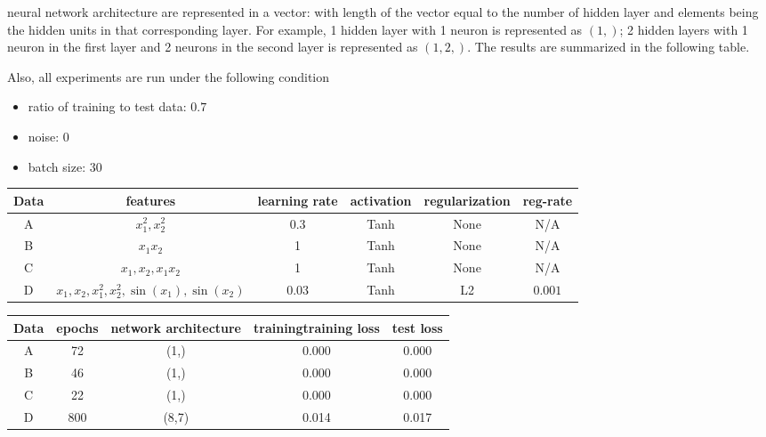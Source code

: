 \documentclass{article}
\begin{document}
neural network architecture are represented in a vector: with length of the vector equal to the number of hidden layer and elements being the hidden units in that corresponding layer. For example, 1 hidden layer with 1 neuron is represented as \((1,)\); 2 hidden layers with 1 neuron in the first layer and 2 neurons in the second layer is represented as \((1,2,)\). The results are summarized in the following table.

Also, all experiments are run under the following condition
\begin{itemize}
    \item ratio of training to test data: \(0.7\)
    \item noise: \(0\)
    \item batch size: \(30\)
\end{itemize}

\begin{center}
    \begin{tabular}{cccccc}\hline
    Data & features &  learning rate & activation & regularization & reg-rate \\ \hline
    A & \(x_1^2,x_2^2\) & 0.3 & Tanh & None & N/A\\
    B & \(x_1 x_2\) & 1 & Tanh & None & N/A \\
    C & \(x_1,x_2,x_1x_2\) &1 & Tanh & None & N/A \\
    D & \(x_1,x_2,x_1^2,x_2^2,\sin(x_1),\sin(x_2)\) & 0.03 & Tanh & L2 & \(0.001\) \\
    \hline
    \end{tabular}
\end{center}
\begin{center}
    \begin{tabular}{ccccc}\hline
        Data & epochs & network architecture & trainingtraining loss & test loss\\\hline
        A & 72 & (1,) & 0.000 & 0.000\\
        B & 46 & (1,) & 0.000 & 0.000\\
        C & 22 & (1,) & 0.000 & 0.000\\
        D & 800 & (8,7) & 0.014 & 0.017\\
        \hline
    \end{tabular}
\end{center}
\end{document}
